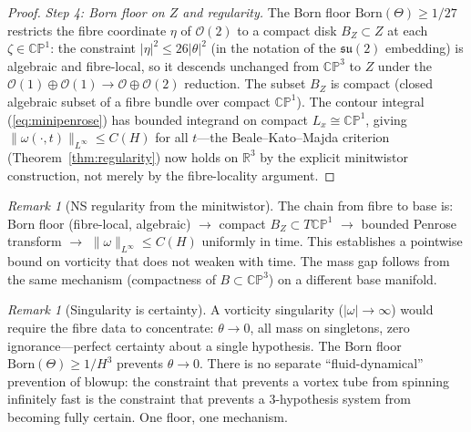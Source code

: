\documentclass[11pt,a4paper]{article}
\theoremstyle{definition}
\theoremstyle{remark}
\newtheorem{remark}[theorem]{Remark}
\newcommand{\CP}{\mathbb{CP}}
\newcommand{\R}{\mathbb{R}}
\newcommand{\su}{\mathfrak{su}}
\begin{document}
\begin{proof}
\emph{Step 4: Born floor on $Z$ and regularity.} The Born floor $\mathrm{Born}(\Theta)\geq 1/27$ restricts the fibre coordinate $\eta$ of $\mathcal{O}(2)$ to a compact disk $B_Z\subset Z$ at each $\zeta\in\CP^1$: the constraint $|\eta|^2\leq 26|\theta|^2$ (in the notation of the $\su(2)$ embedding) is algebraic and fibre-local, so it descends unchanged from $\CP^3$ to $Z$ under the $\mathcal{O}(1)\oplus\mathcal{O}(1)\to\mathcal{O}\oplus\mathcal{O}(2)$ reduction. The subset $B_Z$ is compact (closed algebraic subset of a fibre bundle over compact $\CP^1$). The contour integral (\ref{eq:minipenrose}) has bounded integrand on compact $L_x\cong\CP^1$, giving $\|\omega(\cdot,t)\|_{L^\infty}\leq C(H)$ for all $t$---the Beale--Kato--Majda criterion (Theorem~\ref{thm:regularity}) now holds on $\R^3$ by the explicit minitwistor construction, not merely by the fibre-locality argument.
\end{proof}

\begin{remark}[NS regularity from the minitwistor]
The chain from fibre to base is: Born floor (fibre-local, algebraic) $\to$ compact $B_Z\subset T\CP^1$ $\to$ bounded Penrose transform $\to$ $\|\omega\|_{L^\infty}\leq C(H)$ uniformly in time. This establishes a pointwise bound on vorticity that does not weaken with time. The mass gap follows from the same mechanism (compactness of $B\subset\CP^3$) on a different base manifold.
\end{remark}

\begin{remark}[Singularity is certainty]\label{rem:singularity_certainty}
A vorticity singularity ($|\omega|\to\infty$) would require the fibre data to concentrate: $\theta\to 0$, all mass on singletons, zero ignorance---perfect certainty about a single hypothesis. The Born floor $\mathrm{Born}(\Theta)\geq 1/H^3$ prevents $\theta\to 0$. There is no separate ``fluid-dynamical'' prevention of blowup: the constraint that prevents a vortex tube from spinning infinitely fast is the constraint that prevents a $3$-hypothesis system from becoming fully certain. One floor, one mechanism.
\end{remark}
\end{document}
